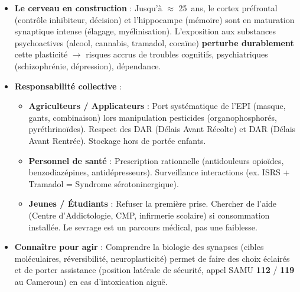 \documentclass[11pt]{article}
\begin{document}
\begin{savaistu}
\begin{itemize}
\item \textbf{Le cerveau en construction} : Jusqu'à $\approx$ \SI{25}{ans}, le cortex préfrontal (contrôle inhibiteur, décision) et l'hippocampe (mémoire) sont en maturation synaptique intense (élagage, myélinisation). L'exposition aux substances psychoactives (alcool, cannabis, tramadol, cocaïne) \textbf{perturbe durablement} cette plasticité $\rightarrow$ risques accrus de troubles cognitifs, psychiatriques (schizophrénie, dépression), dépendance.
\item \textbf{Responsabilité collective} :
\begin{itemize}
\item \textbf{Agriculteurs / Applicateurs} : Port systématique de l'EPI (masque, gants, combinaison) lors manipulation pesticides (organophosphorés, pyréthrinoïdes). Respect des DAR (Délais Avant Récolte) et DAR (Délais Avant Rentrée). Stockage hors de portée enfants.
\item \textbf{Personnel de santé} : Prescription rationnelle (antidouleurs opioïdes, benzodiazépines, antidépresseurs). Surveillance interactions (ex. ISRS + Tramadol = Syndrome sérotoninergique).
\item \textbf{Jeunes / Étudiants} : Refuser la première prise. Chercher de l'aide (Centre d'Addictologie, CMP, infirmerie scolaire) si consommation installée. Le sevrage est un parcours médical, pas une faiblesse.
\end{itemize}
\item \textbf{Connaître pour agir} : Comprendre la biologie des synapses (cibles moléculaires, réversibilité, neuroplasticité) permet de faire des choix éclairés et de porter assistance (position latérale de sécurité, appel SAMU \textbf{112} / \textbf{119} au Cameroun) en cas d'intoxication aiguë.
\end{itemize}
\end{savaistu}
\end{document}
